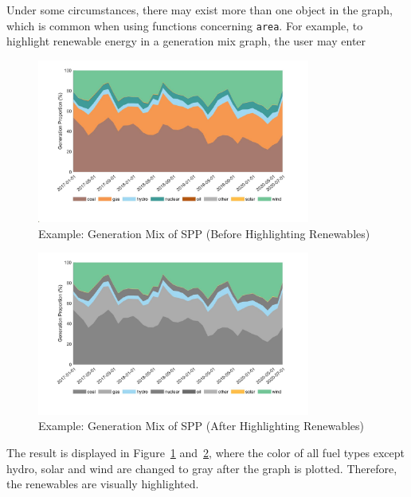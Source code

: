 \documentclass[10pt]{article}
\numberwithin{equation}{section}
\numberwithin{table}{section}
\numberwithin{figure}{section}
\begin{document}
Under some circumstances, there may exist more than one object in the graph, which is common when using functions concerning \verb!area!. For example, to highlight renewable energy in a generation mix graph, the user may enter


\begin{figure}
  \centering
  \noindent\includegraphics[width=0.8\textwidth]{figures/visualization_example6_1.jpg}
  \caption{Example: Generation Mix of SPP (Before Highlighting Renewables)} \label{fig:vis_eg6_1}
\end{figure}

\begin{figure}
  \centering
  \noindent\includegraphics[width=0.8\textwidth]{figures/visualization_example6_2.jpg}
  \caption{Example: Generation Mix of SPP (After Highlighting Renewables)} \label{fig:vis_eg6_2}
\end{figure}

The result is displayed in Figure~\ref{fig:vis_eg6_1} and~\ref{fig:vis_eg6_2}, where the color of all fuel types except hydro, solar and wind are changed to gray after the graph is plotted. Therefore, the renewables are visually highlighted.
\end{document}
